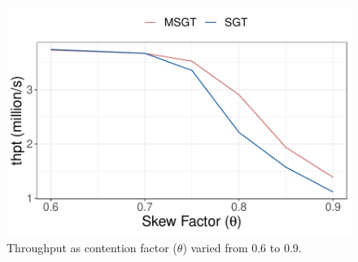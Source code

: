 \begin{figure}[htbp]
    \centering
    \includegraphics[width=0.6\linewidth]{figs/ycsb_contention_thpt}%
      \caption{Throughput as contention factor ($\theta$) varied from 0.6 to 0.9.}
    \label{fig:contention-a}
\end{figure}
